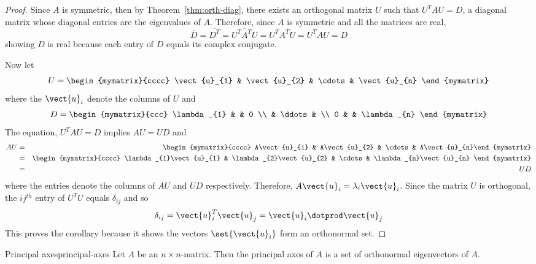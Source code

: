 \begin{proof}
Since $A$ is symmetric, then by Theorem~\ref{thm:orth-diag},
there exists an orthogonal matrix $U$ such that $U^{T}AU=D$, a diagonal
matrix whose diagonal entries are the eigenvalues of $A$. Therefore, since $
A $ is symmetric and all the matrices are real, 
\begin{equation*}
\overline{D}=\overline{D^{T}}=\overline{U^{T}A^{T}U}=U^{T}A^{T}U=U^{T}AU=D
\end{equation*}
showing $D$ is real because each entry of $D$ equals its complex conjugate.

Now let 
\begin{equation*}
U=\begin{mymatrix}{cccc}
\vect{u}_{1} & \vect{u}_{2} & \cdots & \vect{u}_{n}
\end{mymatrix}
\end{equation*}
where the $\vect{u}_{i}$ denote the columns of $U$ and 
\begin{equation*}
D=\begin{mymatrix}{ccc}
\lambda _{1} &  & 0 \\ 
& \ddots &  \\ 
0 &  & \lambda _{n}
\end{mymatrix}
\end{equation*}
The equation, $U^{T}AU=D$ implies $AU = UD$ and 
\begin{eqnarray*}
AU &=&\begin{mymatrix}{cccc}
A\vect{u}_{1} & A\vect{u}_{2} & \cdots & A\vect{u}_{n}%
\end{mymatrix} \\
&=&\begin{mymatrix}{cccc}
\lambda _{1}\vect{u}_{1} & \lambda _{2}\vect{u}_{2} & \cdots & \lambda
_{n}\vect{u}_{n}
\end{mymatrix} \\
&=& UD
\end{eqnarray*}
where the entries denote the columns of $AU$ and $UD$ respectively.
Therefore, $A\vect{u}_{i}=\lambda _{i}\vect{u}_{i}$.  Since the matrix $U$
is orthogonal, the $ij^{th}$ entry of $U^{T}U$ equals $\delta _{ij}$ and so 
\begin{equation*}
\delta _{ij}=\vect{u}_{i}^{T}\vect{u}_{j}=\vect{u}_{i}\dotprod \vect{u}
_{j}
\end{equation*}
This proves the corollary because it shows the vectors $\set{\vect{u}
_{i}} $ form an orthonormal set.
\end{proof}

\begin{definition}{Principal axes}{principal-axes}
Let $A$ be an $n \times n$-matrix. Then the principal axes of $A$ is a set of orthonormal eigenvectors of $A$.
\end{definition}

